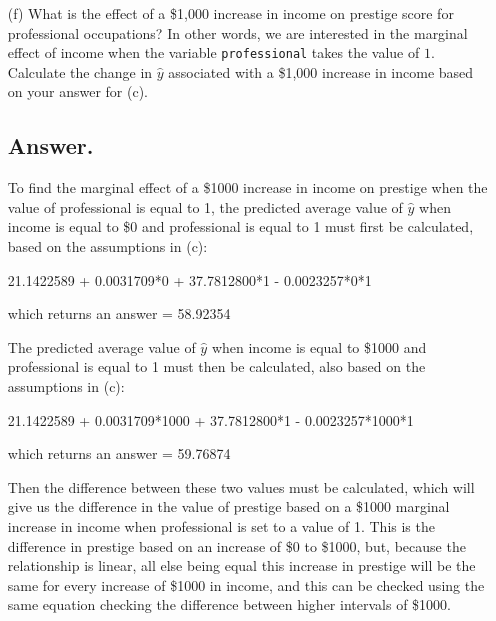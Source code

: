 \documentclass[12pt,letterpaper]{article}
\begin{document}
\begin{enumerate}
	\newpage
	\item [(f)]
	What is the effect of a \$1,000 increase in income on prestige score for professional occupations? In other words, we are interested in the marginal effect of income when the variable \texttt{professional} takes the value of $1$. Calculate the change in $\hat{y}$ associated with a \$1,000 increase in income based on your answer for (c).
	\subsection*{Answer.}
	
	To find the marginal effect of a \$1000 increase in income on prestige when the value of professional is equal to 1, the predicted average value of $\hat{y}$ when income is equal to \$0 and professional is equal to 1 must first be calculated, based on the assumptions in (c):
	
	\vspace{0.1cm}
	
	21.1422589 + 0.0031709*0 + 37.7812800*1 - 0.0023257*0*1
	
	\vspace{0.1cm}
	
	which returns an answer = 58.92354
	
	\vspace{0.1cm}
	
	The predicted average value of $\hat{y}$ when income is equal to \$1000 and professional is equal to 1 must then be calculated, also based on the assumptions in (c):
	
	\vspace{0.1cm}
	
	21.1422589 + 0.0031709*1000 + 37.7812800*1 - 0.0023257*1000*1
	
	\vspace{0.1cm}
	
	which returns an answer = 59.76874
	
	\vspace{0.1cm}
	
	Then the difference between these two values must be calculated, which will give us the difference in the value of prestige based on a \$1000 marginal increase in income when professional is set to a value of 1. This is the difference in prestige based on an increase of \$0 to \$1000, but, because the relationship is linear, all else being equal this increase in prestige will be the same for every increase of \$1000 in income, and this can be checked using the same equation checking the difference between higher intervals of \$1000.
	

\end{enumerate}
\end{document}
